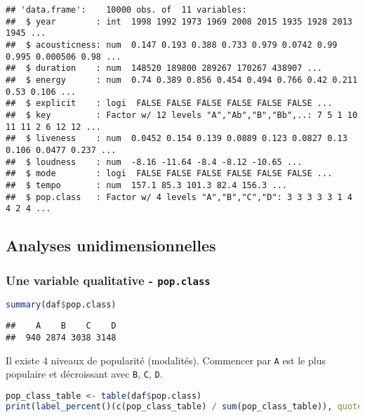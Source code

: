 \documentclass[
  12pt,
  xcolor = usenames,dvipsnames]{article}
\newcommand{\passthrough}[1]{#1}
\begin{document}
\begin{lstlisting}
## 'data.frame':    10000 obs. of  11 variables:
##  $ year        : int  1998 1992 1973 1969 2008 2015 1935 1928 2013 1945 ...
##  $ acousticness: num  0.147 0.193 0.388 0.733 0.979 0.0742 0.99 0.995 0.000506 0.98 ...
##  $ duration    : num  148520 189800 289267 170267 438907 ...
##  $ energy      : num  0.74 0.389 0.856 0.454 0.494 0.766 0.42 0.211 0.53 0.106 ...
##  $ explicit    : logi  FALSE FALSE FALSE FALSE FALSE FALSE ...
##  $ key         : Factor w/ 12 levels "A","Ab","B","Bb",..: 7 5 1 10 11 11 2 6 12 12 ...
##  $ liveness    : num  0.0452 0.154 0.139 0.0889 0.123 0.0827 0.13 0.106 0.0477 0.237 ...
##  $ loudness    : num  -8.16 -11.64 -8.4 -8.12 -10.65 ...
##  $ mode        : logi  FALSE FALSE FALSE FALSE FALSE FALSE ...
##  $ tempo       : num  157.1 85.3 101.3 82.4 156.3 ...
##  $ pop.class   : Factor w/ 4 levels "A","B","C","D": 3 3 3 3 3 1 4 4 2 4 ...
\end{lstlisting}

\hypertarget{analyses-unidimensionnelles}{%
\subsection{Analyses unidimensionnelles}\label{analyses-unidimensionnelles}}

\hypertarget{une-variable-qualitative---pop.class}{%
\subsubsection{\texorpdfstring{Une variable qualitative - \texttt{pop.class}}{Une variable qualitative - pop.class}}\label{une-variable-qualitative---pop.class}}

\begin{lstlisting}[language=R]
summary(daf$pop.class)
\end{lstlisting}

\begin{lstlisting}
##    A    B    C    D 
##  940 2874 3038 3148
\end{lstlisting}

Il existe 4 niveaux de popularité (modalités). Commencer par \passthrough{\lstinline!A!} est le plus populaire et décroissant avec \passthrough{\lstinline!B!}, \passthrough{\lstinline!C!}, \passthrough{\lstinline!D!}.

\begin{lstlisting}[language=R]
pop_class_table <- table(daf$pop.class)
print(label_percent()(c(pop_class_table) / sum(pop_class_table)), quote = F)
\end{lstlisting}
\end{document}
